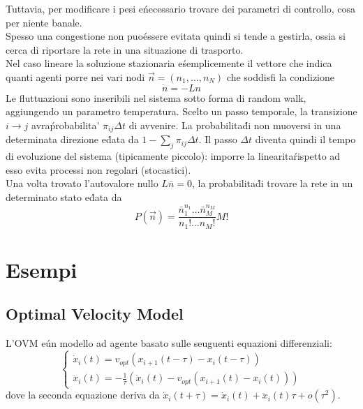 \documentclass[12pt, a4paper]{book}
\theoremstyle{theorem}
\newtheorem{theorem}{Teorema}[section]
\begin{document}
				Tuttavia, per modificare i pesi e\' necessario trovare dei parametri di controllo, cosa per niente banale.\\
				Spesso una congestione non puo\' essere evitata quindi si tende a gestirla, ossia si cerca di riportare la rete in una situazione di trasporto.\\
				Nel caso lineare la soluzione stazionaria e\' semplicemente il vettore che indica quanti agenti porre nei vari nodi $\vec{n}=(n_1,\ldots,n_N)$ che soddisfi la condizione
				\begin{equation*}
					\dot{n}=-Ln
				\end{equation*}
				Le fluttuazioni sono inseribili nel sistema sotto forma di random walk, aggiungendo un parametro temperatura.
				Scelto un passo temporale, la transizione $i\to j$ avra\' probabilita\' $\pi_{ij}\Delta t$ di avvenire.
				La probabilita\' di non muoversi in una determinata direzione e\' data da $1-\sum_j\pi_{ij}\Delta t$.
				Il passo $\Delta t$ diventa quindi il tempo di evoluzione del sistema (tipicamente piccolo): imporre la linearita\' rispetto ad esso evita processi non regolari (stocastici).\\
				Una volta trovato l'autovalore nullo $L\bar{n}=0$, la probabilita\' di trovare la rete in un determinato stato e\' data da
				\begin{equation}
					P(\vec{n})=\frac{\bar{n}_1^{n_1}\ldots\bar{n}_M^{n_M}}{n_1!\ldots n_M!}M!
				\end{equation}

		\section{Esempi}
			\subsection{Optimal Velocity Model}
				L'OVM e\' un modello ad agente basato sulle seuguenti equazioni differenziali:
				\begin{equation}
					\begin{cases}
						\dot{x}_i(t)=v_{opt}\left(x_{i+1}(t-\tau)-x_i(t-\tau)\right)\\
						\ddot{x}_i(t)=-\frac{1}{\tau}\left(\dot{x}_i(t)-v_{opt}(x_{i+1}(t)-x_i(t))\right)
					\end{cases}
				\end{equation}
				dove la seconda equazione deriva da $\dot{x}_i(t+\tau)=\dot{x}_i(t)+\ddot{x}_i(t)\tau+o(\tau^2)$.

		
\end{document}
